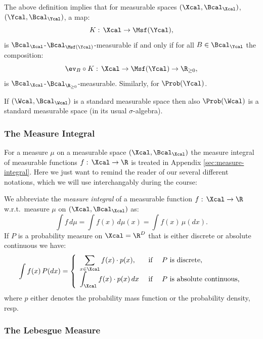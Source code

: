 \begin{Rem}
    \label{rem:prob-sigma-algebra}
    The above definition implies that for measurable spaces $(\Xcal,\Bcal_\Xcal)$, $(\Ycal,\Bcal_\Ycal)$, a map:
    \[ K:\, \Xcal \to \Msf(\Ycal),\]
    is $\Bcal_\Xcal$-$\Bcal_{\Msf(\Ycal)}$-measurable if and only if for all $B \in \Bcal_\Ycal$ the composition:
    \[ \ev_B \circ K:\, \Xcal \to \Msf(\Ycal) \to \R_{\ge 0},   \]
    is $\Bcal_\Xcal$-$\Bcal_{\R_{\ge 0}}$-measurable. Similarly, for $\Prob(\Ycal)$.
\end{Rem}

\begin{Thm}
    If $(\Wcal,\Bcal_\Wcal)$ is a standard measurable space then also $\Prob(\Wcal)$ is a standard 
    measurable space (in its usual $\sigma$-algebra).
\end{Thm}



\subsubsection{The Measure Integral}

For a measure $\mu$ on a measurable space $(\Xcal,\Bcal_\Xcal)$ the measure integral of measurable functions 
$f:\, \Xcal \to \R$ is treated in Appendix \ref{sec:measure-integral}.
Here we just want to remind the reader of our several different notations, which we will use interchangably during the course:

\begin{Not}
 We abbreviate the \emph{measure integral} of a measurable function $f:\, \Xcal \to \R$ 
 w.r.t.\ measure $\mu$ on $(\Xcal,\Bcal_\Xcal)$ as:
 \[ \int f \,d\mu = \int f(x)\,d\mu(x) = \int f(x)\,\mu(dx).\]
 If $P$ is a probability measure on $\Xcal=\R^D$ that is either discrete or absolute continuous we have:
 \[ \int f(x)\, P(dx) = \left\{
         \begin{array}{lcl}
             \displaystyle\sum_{ x \in \Xcal} f(x) \cdot p(x),& \text{ if }& P \text{ is discrete},\\
             \displaystyle\int_\Xcal f(x) \cdot p(x) \, dx & \text{ if }& P \text{ is absolute continuous,}
         \end{array}
 \right. \]
 where $p$ either denotes the probability mass function or the probability density, resp.
\end{Not}

\subsubsection{The Lebesgue Measure}

